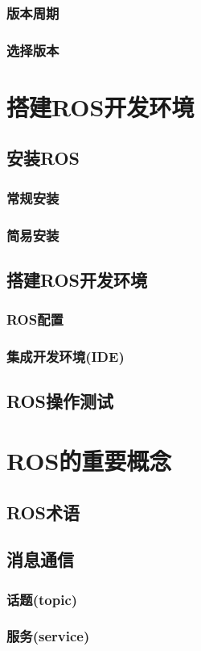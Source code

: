 \documentclass[geye,green,kindle,cn]{elegantnote}
\begin{document}
\subsubsection{版本周期}
\subsubsection{选择版本}
\section{搭建ROS开发环境}
\subsection{安装ROS}
\subsubsection{常规安装}
\subsubsection{简易安装}
\subsection{搭建ROS开发环境}
\subsubsection{ROS配置}
\subsubsection{集成开发环境(IDE)}
\subsection{ROS操作测试}
\section{ROS的重要概念}
\subsection{ROS术语}
\subsection{消息通信}
\subsubsection{话题(topic)}
\subsubsection{服务(service)}
\end{document}
